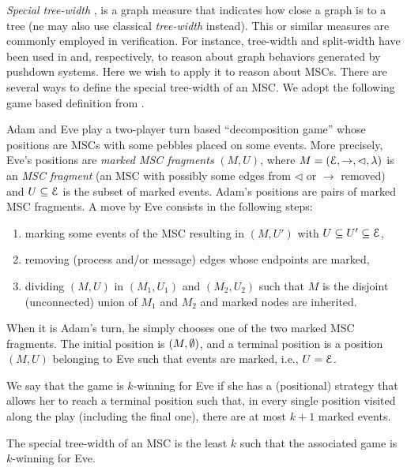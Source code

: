 \documentclass[a4paper,UKenglish,cleveref, autoref, thm-restate]{lipics-v2021}
\begin{document}
\emph{Special tree-width} \cite{Courcelle10},
is a graph measure that indicates how close
a graph is to a tree (ne may also use classical
	\emph{tree-width} instead).
This or similar measures are commonly employed in verification. For instance, tree-width and split-width have been used in \cite{} and, respectively, \cite{DBLP:conf/concur/CyriacGK12} to reason about graph behaviors generated by pushdown systems. Here we wish to apply it to reason about MSCs.
There are several ways to define the special tree-width of an MSC.
We adopt the following game based definition from \cite{DBLP:journals/corr/abs-1904-06942}.

Adam and Eve play a two-player turn based ``decomposition game''
whose positions
are MSCs with some pebbles placed on some events.
More precisely, Eve's positions are
\emph{marked MSC fragments} $(M, U)$, where
$M = (\mathcal{E}, \to, \lhd, \lambda)$
is an \emph{MSC fragment} (an MSC with possibly some edges from
$\lhd$ or $\to$ removed)
 and $U \subseteq \mathcal{E}$ is the subset of marked events.
Adam's positions are pairs of marked MSC fragments.
A move by Eve consists in the following steps:
\begin{enumerate}
	\item marking some events of the MSC resulting in $(M, U')$ with $U \subseteq U' \subseteq \mathcal{E}$,
	\item removing (process and/or message) edges whose endpoints are marked,
	\item dividing $(M, U)$ in $(M_1, U_1)$ and $(M_2, U_2)$ such that $M$ is the disjoint (unconnected) union of $M_1$ and $M_2$
	and marked nodes are inherited.
\end{enumerate}
When it is Adam's turn, he simply chooses one of the two marked MSC fragments.
The initial position is $(M,\emptyset)$, and a terminal position is a position $(M, U)$ belonging to Eve such that events are marked, i.e., $U = \mathcal{E}$.

We say that the game is $k$-winning for Eve if she has a (positional) strategy that allows her to reach a terminal position such that, in every single position visited along the play (including the final one),
there are at most $k+1$ marked events.


\begin{fact}
	The special tree-width of an MSC is the least $k$ such that
	the associated game is $k$-winning for Eve.
\end{fact}
\end{document}
